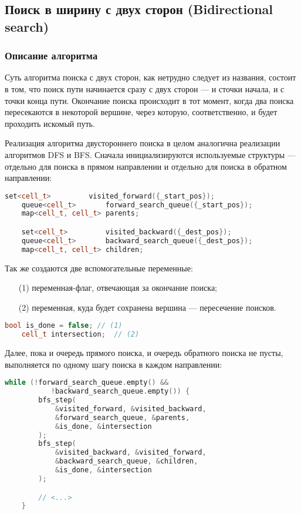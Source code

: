 \documentclass[a4paper, 12pt]{article}
\begin{document}
\subsection{Поиск в ширину с двух сторон (Bidirectional search)}
\subsubsection{Описание алгоритма}
Суть алгоритма поиска с двух сторон, как нетрудно следует из названия, состоит в том, что поиск пути начинается сразу с двух сторон --- и сточки начала, и с точки конца пути. Окончание поиска происходит в тот момент, когда два поиска пересекаются в некоторой вершине, через которую, соответственно, и будет проходить искомый путь.

Реализация алгоритма двустороннего поиска в целом аналогична реализации алгоритмов DFS и BFS. Сначала  инициализируются используемые структуры --- отдельно для поиска в прямом направлении и отдельно для поиска в обратном направлении:

\begin{lstlisting}[language=C++]
    set<cell_t>         visited_forward({_start_pos});
    queue<cell_t>       forward_search_queue({_start_pos});
    map<cell_t, cell_t> parents;

    set<cell_t>         visited_backward({_dest_pos});
    queue<cell_t>       backward_search_queue({_dest_pos});
    map<cell_t, cell_t> children;
\end{lstlisting}

Так же создаются две вспомогательные переменные:
\begin{itemize}
    \item[(1)] переменная-флаг, отвечающая за окончание поиска;
    \item[(2)] переменная, куда будет сохранена вершина --- пересечение поисков.
\end{itemize}
\begin{lstlisting}[language=C++]
    bool is_done = false; // (1)
    cell_t intersection;  // (2)
\end{lstlisting}

Далее, пока и очередь прямого поиска, и очередь обратного поиска не пусты, выполняется по одному шагу поиска в каждом направлении:
\begin{lstlisting}[language=C++]
    while (!forward_search_queue.empty() &&
           !backward_search_queue.empty()) {
        bfs_step(
            &visited_forward, &visited_backward,
            &forward_search_queue, &parents,
            &is_done, &intersection
        );
        bfs_step(
            &visited_backward, &visited_forward,
            &backward_search_queue, &children,
            &is_done, &intersection
        );

        // <...>
    }
\end{lstlisting}
\end{document}
